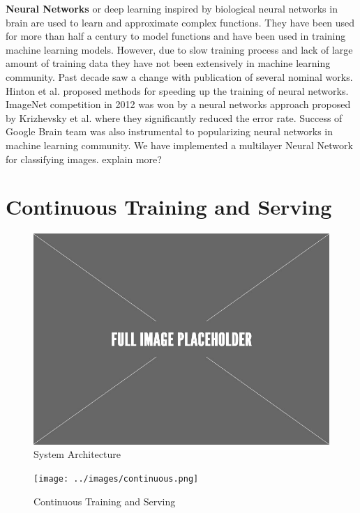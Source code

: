 \documentclass{sig-alternate-05-2015}
\begin{document}
\textbf{Neural Networks} or deep learning inspired by biological neural networks in brain are used to learn and approximate complex functions. 
They have been used for more than half a century to model functions and have been used in training machine learning models.
However, due to slow training process and lack of large amount of training data they have not been extensively in machine learning community.
Past decade saw a change with publication of several nominal works.
Hinton et al. \cite{hinton2006fast} proposed methods for speeding up the training of neural networks.
ImageNet competition \cite{ILSVRC15} in 2012 was won by a neural networks approach proposed by Krizhevsky et al. \cite{krizhevsky2012imagenet} where they significantly reduced the error rate. 
Success of Google Brain team \cite{sutskever2014sequence, mikolov2013efficient} was also instrumental to popularizing neural networks in machine learning community.
We have implemented a multilayer Neural Network for classifying images. {\color{red}explain more?}

\section{Continuous Training and Serving} \label{continious-training-serving}
\begin{figure}[h]
\centering
\includegraphics[scale=0.30]{../images/placeholder.jpeg}
\caption{System Architecture}
\label{fig:system-architecture}
\end{figure}

\begin{figure}[h]
\centering
\texttt{[image: ../images/continuous.png]}
\caption{Continuous Training and Serving}
\label{fig:cont-training-serving}
\end{figure}
\end{document}
